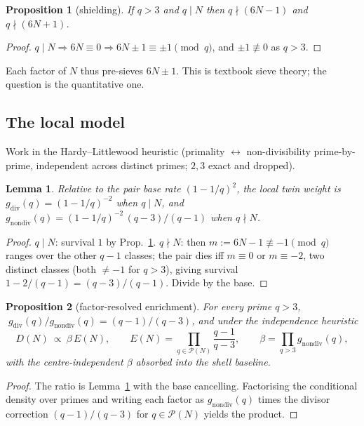 \documentclass[11pt]{article}
\newtheorem{proposition}{Proposition}
\newtheorem{lemma}{Lemma}
\theoremstyle{definition}
\theoremstyle{remark}
\begin{document}
\begin{proposition}[shielding]\label{prop:shield}
If $q>3$ and $q\mid N$ then $q\nmid(6N-1)$ and $q\nmid(6N+1)$.
\end{proposition}
\begin{proof}
$q\mid N\Rightarrow 6N\equiv0\Rightarrow6N\pm1\equiv\pm1\pmod q$, and
$\pm1\not\equiv0$ as $q>3$.
\end{proof}

Each factor of $N$ thus pre-sieves $6N\pm1$. This is textbook sieve theory; the
question is the quantitative one.

\subsection{The local model}
Work in the Hardy--Littlewood heuristic (primality $\leftrightarrow$
non-divisibility prime-by-prime, independent across distinct primes; $2,3$ exact
and dropped).

\begin{lemma}\label{lem:two}
Relative to the pair base rate $(1-1/q)^2$, the local twin weight is
$g_{\mathrm{div}}(q)=(1-1/q)^{-2}$ when $q\mid N$, and
$g_{\mathrm{nondiv}}(q)=(1-1/q)^{-2}\,(q-3)/(q-1)$ when $q\nmid N$.
\end{lemma}
\begin{proof}
$q\mid N$: survival $1$ by Prop.~\ref{prop:shield}. $q\nmid N$: then
$m:=6N-1\not\equiv-1\pmod q$ ranges over the other $q-1$ classes; the pair dies iff
$m\equiv0$ or $m\equiv-2$, two distinct classes (both $\neq-1$ for $q>3$), giving
survival $1-2/(q-1)=(q-3)/(q-1)$. Divide by the base.
\end{proof}

\begin{proposition}[factor-resolved enrichment]\label{prop:main}
For every prime $q>3$, $\;g_{\mathrm{div}}(q)/g_{\mathrm{nondiv}}(q)=(q-1)/(q-3)$,
and under the independence heuristic
\[
  D(N)\ \propto\ \beta\,E(N),\qquad
  E(N)=\!\!\prod_{q\in\mathcal P(N)}\!\frac{q-1}{q-3},\qquad
  \beta=\prod_{q>3}g_{\mathrm{nondiv}}(q),
\]
with the centre-independent $\beta$ absorbed into the shell baseline.
\end{proposition}
\begin{proof}
The ratio is Lemma~\ref{lem:two} with the base cancelling. Factorising the
conditional density over primes and writing each factor as $g_{\mathrm{nondiv}}(q)$
times the divisor correction $(q-1)/(q-3)$ for $q\in\mathcal P(N)$ yields the
product.
\end{proof}
\end{document}
